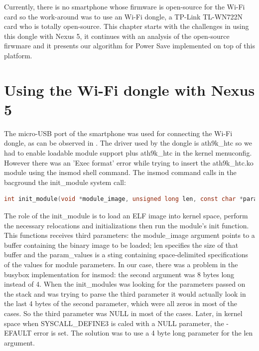 Currently, there is no smartphone whose firmware is open-source for the Wi-Fi card so the work-around was to use an Wi-Fi dongle, a TP-Link TL-WN722N card \cite{cite-tplink} who is totally open-source. This chapter starts with the challenges in using this dongle with Nexus 5, it continues with an analysis of the open-source firwmare and it presents our algorithm for Power Save implemented on top of this platform.

\section{Using the Wi-Fi dongle with Nexus 5}
\label{sec:donglesmartphone}

The micro-USB port of the smartphone was used for connecting the Wi-Fi dongle, as can be observed in . The driver used by the dongle is ath9k_htc so we had to enable loadable module support plus ath9k_htc in the kernel menuconfig. However there was an 'Exec format' error while trying to insert the ath9k_htc.ko module using the insmod shell command. The insmod command calls in the bacground the init_module system call:

\begin{lstlisting}[language=C, frame=single, caption={init_module system call},label=InterfaceCombinations]
int init_module(void *module_image, unsigned long len, const char *param_values);
\end{lstlisting}


The role of the init_module is to load an ELF image into kernel space, perform the necessary relocations and initializations then run the module's init function. This functions receives third parameters: the module_image argument points to a buffer containing the binary image to be loaded; len specifies the size of that buffer and the param_values is a sting containing space-delimited specifications of the values for module parameters. In our case, there was a problem in the busybox implementation for insmod: the second argument was 8 bytes long instead of 4. When the init_modules was looking for the parameters passed on the stack and was trying to parse the third parameter it would actually look in the last 4 bytes of the second parameter, which were all zeros in most of the cases. So the third parameter was NULL in most of the cases. Later, in kernel space when SYSCALL_DEFINE3 is caled with a NULL parameter, the -EFAULT error is set. The solution was to use a 4 byte long parameter for the len argument.

